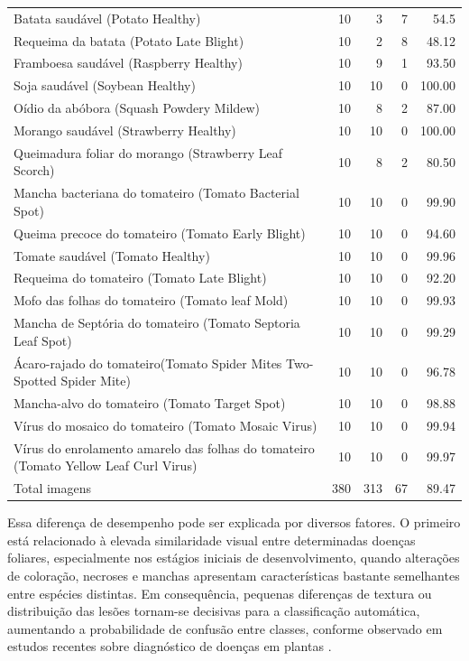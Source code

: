 \documentclass[portuguese]{sbc2025}%
\begin{document}
\begin{table}[ht]
{\begin{tabular}{p{4.0cm}rrrr}
Batata saudável (Potato Healthy) & 10 & 3 & 7 & 54.5 \\
Requeima da batata (Potato Late Blight) & 10 & 2 & 8 & 48.12 \\
Framboesa saudável (Raspberry Healthy) & 10 & 9 & 1 & 93.50 \\
Soja saudável (Soybean Healthy) & 10 & 10 & 0 & 100.00 \\
Oídio da abóbora (Squash Powdery Mildew) & 10 & 8 & 2 & 87.00 \\
Morango saudável (Strawberry Healthy) & 10 & 10 & 0 & 100.00 \\
Queimadura foliar do morango (Strawberry Leaf Scorch) & 10 & 8 & 2 & 80.50 \\
Mancha bacteriana do tomateiro (Tomato Bacterial Spot) & 10 & 10 & 0 & 99.90 \\
Queima precoce do tomateiro (Tomato Early Blight) & 10 & 10 & 0 & 94.60 \\
Tomate saudável (Tomato Healthy) & 10 & 10 & 0 & 99.96 \\
Requeima do tomateiro (Tomato Late Blight) & 10 & 10 & 0 & 92.20 \\
Mofo das folhas do tomateiro (Tomato leaf Mold) & 10 & 10 & 0 & 99.93 \\
Mancha de Septória do tomateiro (Tomato Septoria Leaf Spot) & 10 & 10 & 0 & 99.29 \\
Ácaro-rajado do tomateiro(Tomato Spider Mites Two-Spotted Spider Mite) & 10 & 10 & 0 & 96.78 \\
Mancha-alvo do tomateiro (Tomato Target Spot) & 10 & 10 & 0 & 98.88 \\
Vírus do mosaico do tomateiro (Tomato Mosaic Virus) & 10 & 10 & 0 & 99.94 \\
Vírus do enrolamento amarelo das folhas do tomateiro (Tomato Yellow Leaf Curl Virus) & 10 & 10 & 0 & 99.97 \\
Total imagens & 380 & 313 & 67 & 89.47 \\
\hline
\end{tabular}
}
\label{tab:desempenho_classes}
\end{table}

Essa diferença de desempenho pode ser explicada por diversos fatores. O primeiro está relacionado à elevada similaridade visual entre
determinadas doenças foliares, especialmente nos estágios iniciais de desenvolvimento, quando alterações de coloração, necroses e 
manchas apresentam características bastante semelhantes entre espécies distintas. Em consequência, pequenas diferenças de textura 
ou distribuição das lesões tornam-se decisivas para a classificação automática, aumentando a probabilidade de confusão entre classes,
conforme observado em estudos recentes sobre diagnóstico de doenças em plantas \citep{ref2,ref3}.
\end{document}
